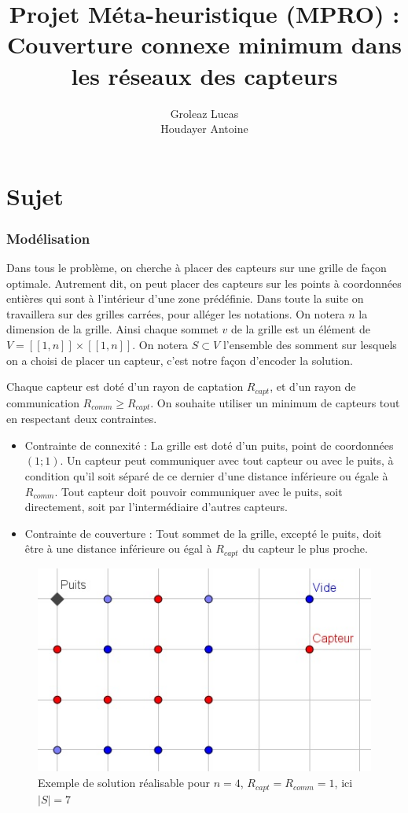 \documentclass[12pt,a4paper]{article}
\title{Projet Méta-heuristique (MPRO) : Couverture connexe minimum dans les réseaux des capteurs}
\author{Groleaz Lucas \\ Houdayer Antoine}
\begin{document}
\maketitle
\tableofcontents
\part{Sujet}
\section{Modélisation}
Dans tous le problème, on cherche à placer des capteurs sur une grille de façon optimale. Autrement dit, on peut placer des capteurs sur les points à coordonnées entières qui sont à l'intérieur d'une zone prédéfinie. Dans toute la suite on travaillera sur des grilles carrées, pour alléger les notations. On notera $n$ la dimension de la grille. Ainsi chaque sommet $v$ de la grille est un élément de $V=[\![1,n]\!]\times [\![1,n]\!]$. On notera $S\subset V$ l'ensemble des somment sur lesquels on a choisi de placer un capteur, c'est notre façon d'encoder la solution.

Chaque capteur est doté d'un rayon de captation $R_{capt}$, et d'un rayon de communication $R_{comm}\geq R_{capt}$.  On souhaite utiliser un minimum de capteurs tout en respectant deux contraintes.
\begin{itemize}
\item Contrainte de connexité : La grille est doté d'un puits, point de coordonnées $(1;1)$. Un capteur peut communiquer avec tout capteur ou avec le puits, à condition qu'il soit séparé de ce dernier d'une distance inférieure ou égale à $R_{comm}$. Tout capteur doit pouvoir communiquer avec le puits, soit directement, soit par l'intermédiaire d'autres capteurs. 

\item Contrainte de couverture : Tout sommet de la grille, excepté le puits, doit être à une distance inférieure ou égal à $R_{capt}$ du capteur le plus proche.

\end{itemize}

\begin{figure}[h]
\begin{center}
\includegraphics[scale=1]{Images/4_1_1_realisable.jpg}
\caption{Exemple de solution réalisable pour $n=4$, $R_{capt}=R_{comm}=1$, ici $|S|=7$}
\end{center}
\end{figure}
\end{document}
